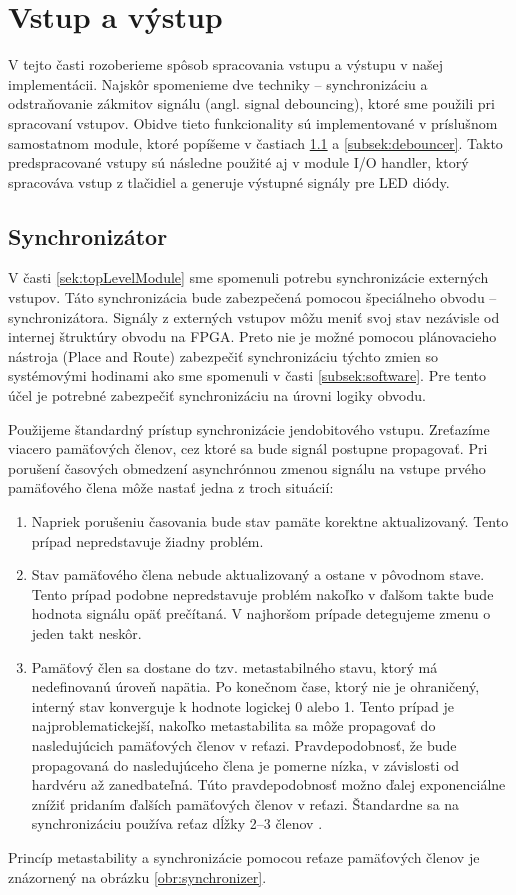 \section{Vstup a výstup}
V tejto časti rozoberieme spôsob spracovania vstupu a výstupu v našej implementácii. Najskôr spomenieme dve techniky -- synchronizáciu a odstraňovanie zákmitov signálu (angl. signal debouncing), ktoré sme použili pri spracovaní vstupov. Obidve tieto funkcionality sú implementované v príslušnom samostatnom module, ktoré popíšeme v častiach \ref{subsek:synchronizer} a \ref{subsek:debouncer}. Takto predspracované vstupy sú následne použité aj v module I/O handler, ktorý spracováva vstup z tlačidiel a generuje výstupné signály pre LED diódy.

\subsection{Synchronizátor} \label{subsek:synchronizer}
V časti \ref{sek:topLevelModule} sme spomenuli potrebu synchronizácie externých vstupov. Táto synchronizácia bude zabezpečená pomocou špeciálneho obvodu -- synchronizátora. Signály z externých vstupov môžu meniť svoj stav nezávisle od internej štruktúry obvodu na FPGA. Preto nie je možné pomocou plánovacieho nástroja (Place and Route) zabezpečiť synchronizáciu týchto zmien so systémovými hodinami ako sme spomenuli v časti \ref{subsek:software}. Pre tento účel je potrebné zabezpečiť synchronizáciu na úrovni logiky obvodu.

Použijeme štandardný prístup synchronizácie jendobitového vstupu. Zreťazíme viacero pamäťových členov, cez ktoré sa bude signál postupne propagovať. Pri porušení časových obmedzení asynchrónnou zmenou signálu na vstupe prvého pamäťového člena môže nastať jedna z troch situácií:
\begin{enumerate}
    \item Napriek porušeniu časovania bude stav pamäte korektne aktualizovaný. Tento prípad nepredstavuje žiadny problém.
    \item Stav pamäťového člena nebude aktualizovaný a ostane v pôvodnom stave. Tento prípad podobne nepredstavuje problém nakoľko v ďalšom takte bude hodnota signálu opäť prečítaná. V najhoršom prípade detegujeme zmenu o jeden takt neskôr.
    \item Pamäťový člen sa dostane do tzv. metastabilného stavu, ktorý má nedefinovanú úroveň napätia. Po konečnom čase, ktorý nie je ohraničený, interný stav konverguje k hodnote logickej 0 alebo 1. Tento prípad je najproblematickejší, nakoľko metastabilita sa môže propagovať do nasledujúcich pamäťových členov v reťazi. Pravdepodobnosť, že bude propagovaná do nasledujúceho člena je pomerne nízka, v závislosti od hardvéru až zanedbateľná. Túto pravdepodobnosť možno ďalej exponenciálne znížiť pridaním ďalších pamäťových členov v reťazi. Štandardne sa na synchronizáciu používa reťaz dĺžky 2--3 členov \cite{metastability}.
\end{enumerate}
Princíp metastability a synchronizácie pomocou reťaze pamäťových členov je znázornený na obrázku \ref{obr:synchronizer}.

